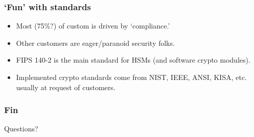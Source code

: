 \documentclass{beamer}
\begin{document}
\frame
{
  \frametitle{`Fun' with standards}

  \begin{itemize}
    \item<1-> Most (75\%?) of custom is driven by `compliance.'
    \item<2-> Other customers are eager/paranoid security folks.
  \end{itemize}

  \begin{itemize}
    \item<3-> FIPS 140-2 is the main standard for HSMs (and software crypto modules).
    \item<4-> Implemented crypto standards come from NIST, IEEE, ANSI, KISA, etc. usually at request of customers.
  \end{itemize}
}

\frame
{
  \frametitle{Fin}
  Questions?
}
\end{document}
